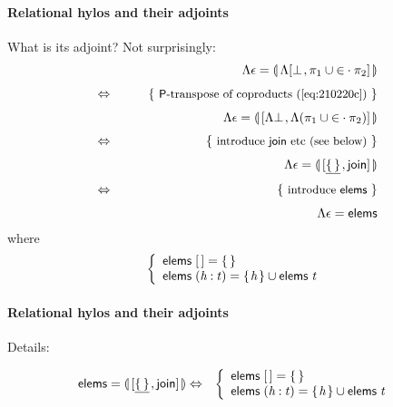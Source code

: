 \documentclass{elsarticle}
\newcommand{\Varid}[1]{\mathit{#1}}
\newenvironment{lcbr}{\left\{\begin{array}{l}}{\end{array}\right.}
\def\alt#1#2{\mathopen{[}#1\hskip 1pt,#2\mathclose{]}}
\def\comp{ \mathbin{\cdot} }
\def\fun#1{\mathsf{#1}}
\def\just#1#2{\\ &#1& \rule{2em}{0pt} \{ \mbox{\rule[-.7em]{0pt}{1.8em} \small #2 \/} \} \nonumber\\ && }
\def\p#1{\pi_{#1}}
\let\kons=\underline
\def\start{&&}
\def\equiv{\Leftrightarrow}
\begin{document}
\paragraph{Relational hylos and their adjoints}
What is its adjoint? Not surprisingly:
\begin{eqnarray}
\start
	\ensuremath{\Lambda{\mathbin\epsilon }\mathrel{=}\llparenthesis\,\Lambda{\alt{\bot }{{\p1}\mathbin\cup{\mathbin\in  \comp \p2}}}\,\rrparenthesis}
	\nonumber
%
\just\equiv{ \ensuremath{\fun P }-transpose of coproducts (\ref{eq:210220c}) }
%
	\ensuremath{\Lambda{\mathbin\epsilon }\mathrel{=}\llparenthesis\,\alt{\Lambda{\bot }}{\Lambda{({\p1}\mathbin\cup{\mathbin\in  \comp \p2})}}\,\rrparenthesis}
	\nonumber
%
\just\equiv{ introduce \ensuremath{\mathsf{join}} etc (see below) }
%
	\ensuremath{\Lambda{\mathbin\epsilon }\mathrel{=}\llparenthesis\,\alt{\kons{\{\mskip1.5mu \mskip1.5mu\}}}{\mathsf{join}}\,\rrparenthesis}
	\nonumber
%
\just\equiv{ introduce \ensuremath{\mathsf{elems}} }
%
	\ensuremath{\Lambda{\mathbin\epsilon }\mathrel{=}\mathsf{elems}}
	\label{eq:210826a}
%
\end{eqnarray}
where 
\begin{eqnarray*}
	\ensuremath{\begin{lcbr}\mathsf{elems}\;[\mskip1.5mu \mskip1.5mu]\mathrel{=}\{\mskip1.5mu \mskip1.5mu\}\\\mathsf{elems}\;(\Varid{h}\mathbin{:}\Varid{t})\mathrel{=}\{\mskip1.5mu \Varid{h}\mskip1.5mu\}\cup \mathsf{elems}\;\Varid{t}\end{lcbr}}
\end{eqnarray*}

%

\paragraph{Relational hylos and their adjoints}

Details:

\begin{eqnarray*}
%
	\ensuremath{\mathsf{elems}\mathrel{=}\llparenthesis\,\alt{\kons{\{\mskip1.5mu \mskip1.5mu\}}}{\mathsf{join}}\,\rrparenthesis} 
&
	\equiv
&
	\ensuremath{\begin{lcbr}\mathsf{elems}\;[\mskip1.5mu \mskip1.5mu]\mathrel{=}\{\mskip1.5mu \mskip1.5mu\}\\\mathsf{elems}\;(\Varid{h}\mathbin{:}\Varid{t})\mathrel{=}\{\mskip1.5mu \Varid{h}\mskip1.5mu\}\cup \mathsf{elems}\;\Varid{t}\end{lcbr}}
\end{eqnarray*}
\end{document}
